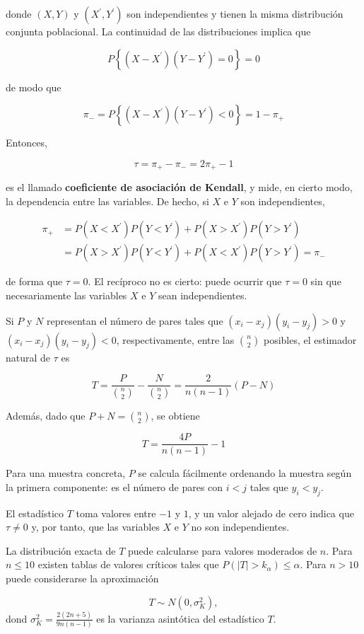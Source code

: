 \documentclass[
]{article}
\begin{document}
donde \((X, Y)\) y \((X^{\prime}, Y^{\prime})\) son independientes y tienen la misma distribución conjunta poblacional.
La continuidad de las distribuciones implica que

\[
P\left\{(X-X^{\prime})(Y-Y^{\prime})=0\right\}=0
\]

de modo que

\[
\pi_{-}=P\left\{(X-X^{\prime})(Y-Y^{\prime})<0\right\}=1-\pi_{+}
\]

Entonces,

\[
\tau=\pi_{+}-\pi_{-}=2\pi_{+}-1
\]

es el llamado \textbf{coeficiente de asociación de Kendall}, y mide, en cierto modo, la dependencia entre las variables. De hecho, si \(X\) e \(Y\) son independientes,

\[
\begin{aligned}
\pi_{+} & =P(X<X^{\prime})P(Y<Y^{\prime})+P(X>X^{\prime})P(Y>Y^{\prime}) \\
& =P(X>X^{\prime})P(Y<Y^{\prime})+P(X<X^{\prime})P(Y>Y^{\prime})=\pi_{-}
\end{aligned}
\]

de forma que \(\tau=0\). El recíproco no es cierto: puede ocurrir que \(\tau=0\) sin que necesariamente las variables \(X\) e \(Y\) sean independientes.

Si \(P\) y \(N\) representan el número de pares tales que \((x_{i}-x_{j})(y_{i}-y_{j})>0\) y \((x_{i}-x_{j})(y_{i}-y_{j})<0\), respectivamente, entre las \(\binom{n}{2}\) posibles, el estimador natural de \(\tau\) es

\[
T=\frac{P}{\binom{n}{2}}-\frac{N}{\binom{n}{2}}=\frac{2}{n(n-1)}(P-N)
\]

Además, dado que \(P+N=\binom{n}{2}\), se obtiene

\[
T=\frac{4P}{n(n-1)}-1
\]

Para una muestra concreta, \(P\) se calcula fácilmente ordenando la muestra según la primera componente: es el número de pares con \(i<j\) tales que \(y_{i}<y_{j}\).

El estadístico \(T\) toma valores entre \(-1\) y \(1\), y un valor alejado de cero indica que \(\tau \neq 0\) y, por tanto, que las variables \(X\) e \(Y\) no son independientes.

La distribución exacta de \(T\) puede calcularse para valores moderados de \(n\). Para \(n \leq 10\) existen tablas de valores críticos tales que \(P(|T|>k_{\alpha}) \leq \alpha\). Para \(n>10\) puede considerarse la aproximación

\[
T \sim N\left(0, \sigma_K^2\right),
\]
dond \(\displaystyle{\sigma_K^2 =\frac{2(2n+5)}{9n(n-1)}}\) es la varianza asintótica del estadístico \(T\).
\end{document}
